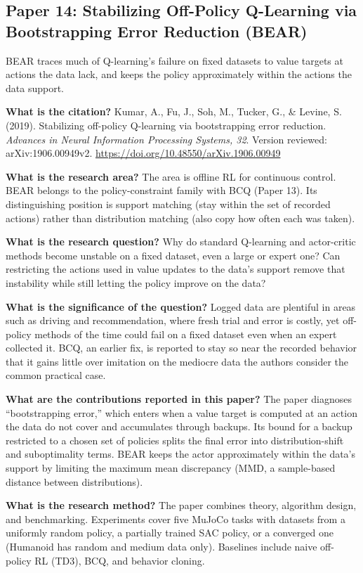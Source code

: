 \documentclass[11pt]{article}
\newcommand{\paper}[1]{\subsection*{#1}}
\newcommand{\q}[2]{\item \textbf{#1} #2}
\begin{document}
\paper{Paper 14: Stabilizing Off-Policy Q-Learning via Bootstrapping Error Reduction (BEAR)}
BEAR traces much of Q-learning's failure on fixed datasets to value targets at actions the data lack, and keeps the policy approximately within the actions the data support.
\begin{qna}

\q{What is the citation?}
Kumar, A., Fu, J., Soh, M., Tucker, G., \& Levine, S. (2019). Stabilizing off-policy Q-learning via bootstrapping error reduction. \emph{Advances in Neural Information Processing Systems, 32}. Version reviewed: arXiv:1906.00949v2. \url{https://doi.org/10.48550/arXiv.1906.00949}

\q{What is the research area?}
The area is offline RL for continuous control. BEAR belongs to the policy-constraint family with BCQ (Paper 13). Its distinguishing position is support matching (stay within the set of recorded actions) rather than distribution matching (also copy how often each was taken).

\q{What is the research question?}
Why do standard Q-learning and actor-critic methods become unstable on a fixed dataset, even a large or expert one? Can restricting the actions used in value updates to the data's support remove that instability while still letting the policy improve on the data?

\q{What is the significance of the question?}
Logged data are plentiful in areas such as driving and recommendation, where fresh trial and error is costly, yet off-policy methods of the time could fail on a fixed dataset even when an expert collected it. BCQ, an earlier fix, is reported to stay so near the recorded behavior that it gains little over imitation on the mediocre data the authors consider the common practical case.

\q{What are the contributions reported in this paper?}
The paper diagnoses ``bootstrapping error,'' which enters when a value target is computed at an action the data do not cover and accumulates through backups. Its bound for a backup restricted to a chosen set of policies splits the final error into distribution-shift and suboptimality terms. BEAR keeps the actor approximately within the data's support by limiting the maximum mean discrepancy (MMD, a sample-based distance between distributions).

\q{What is the research method?}
The paper combines theory, algorithm design, and benchmarking. Experiments cover five MuJoCo tasks with datasets from a uniformly random policy, a partially trained SAC policy, or a converged one (Humanoid has random and medium data only). Baselines include naive off-policy RL (TD3), BCQ, and behavior cloning.


\end{qna}
\end{document}
